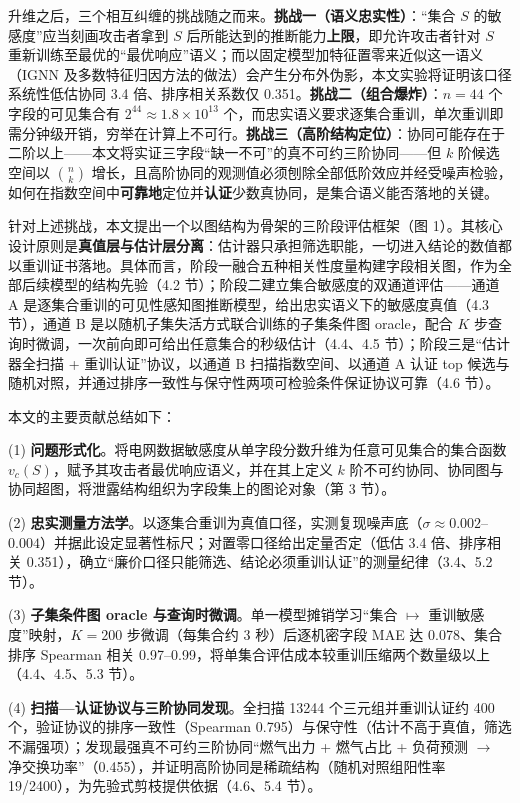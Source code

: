 \documentclass[10.5pt,compsoc,UTF8]{CjC}
\theoremstyle{mystyle}
\begin{document}
升维之后，三个相互纠缠的挑战随之而来。\textbf{挑战一（语义忠实性）}：“集合 $S$ 的敏感度”应当刻画攻击者拿到 $S$ 后所能达到的推断能力\textbf{上限}，即允许攻击者针对 $S$ 重新训练至最优的“最优响应”语义；而以固定模型加特征置零来近似这一语义（IGNN 及多数特征归因方法的做法）会产生分布外伪影，本文实验将证明该口径系统性低估协同 3.4 倍、排序相关系数仅 0.351。\textbf{挑战二（组合爆炸）}：$n=44$ 个字段的可见集合有 $2^{44}\approx 1.8\times10^{13}$ 个，而忠实语义要求逐集合重训，单次重训即需分钟级开销，穷举在计算上不可行。\textbf{挑战三（高阶结构定位）}：协同可能存在于二阶以上——本文将实证三字段“缺一不可”的真不可约三阶协同——但 $k$ 阶候选空间以 $\binom{n}{k}$ 增长，且高阶协同的观测值必须刨除全部低阶效应并经受噪声检验，如何在指数空间中\textbf{可靠地}定位并\textbf{认证}少数真协同，是集合语义能否落地的关键。

针对上述挑战，本文提出一个以图结构为骨架的三阶段评估框架（图 1）。其核心设计原则是\textbf{真值层与估计层分离}：估计器只承担筛选职能，一切进入结论的数值都以重训证书落地。具体而言，阶段一融合五种相关性度量构建字段相关图，作为全部后续模型的结构先验（4.2 节）；阶段二建立集合敏感度的双通道评估——通道 A 是逐集合重训的可见性感知图推断模型，给出忠实语义下的敏感度真值（4.3 节），通道 B 是以随机子集失活方式联合训练的子集条件图 oracle，配合 $K$ 步查询时微调，一次前向即可给出任意集合的秒级估计（4.4、4.5 节）；阶段三是“估计器全扫描 + 重训认证”协议，以通道 B 扫描指数空间、以通道 A 认证 top 候选与随机对照，并通过排序一致性与保守性两项可检验条件保证协议可靠（4.6 节）。

本文的主要贡献总结如下：

(1) \textbf{问题形式化}。将电网数据敏感度从单字段分数升维为任意可见集合的集合函数 $v_c(S)$，赋予其攻击者最优响应语义，并在其上定义 $k$ 阶不可约协同、协同图与协同超图，将泄露结构组织为字段集上的图论对象（第 3 节）。

(2) \textbf{忠实测量方法学}。以逐集合重训为真值口径，实测复现噪声底（$\sigma\approx0.002$--$0.004$）并据此设定显著性标尺；对置零口径给出定量否定（低估 3.4 倍、排序相关 0.351），确立“廉价口径只能筛选、结论必须重训认证”的测量纪律（3.4、5.2 节）。

(3) \textbf{子集条件图 oracle 与查询时微调}。单一模型摊销学习“集合 $\mapsto$ 重训敏感度”映射，$K{=}200$ 步微调（每集合约 3 秒）后逐机密字段 MAE 达 0.078、集合排序 Spearman 相关 0.97--0.99，将单集合评估成本较重训压缩两个数量级以上（4.4、4.5、5.3 节）。

(4) \textbf{扫描—认证协议与三阶协同发现}。全扫描 13244 个三元组并重训认证约 400 个，验证协议的排序一致性（Spearman 0.795）与保守性（估计不高于真值，筛选不漏强项）；发现最强真不可约三阶协同“燃气出力 + 燃气占比 + 负荷预测 $\to$ 净交换功率”（0.455），并证明高阶协同是稀疏结构（随机对照组阳性率 19/2400），为先验式剪枝提供依据（4.6、5.4 节）。
\end{document}
